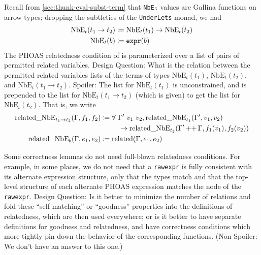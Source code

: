 Recall from \autoref{sec:thunk-eval-subst-term} that \texttt{NbEₜ} values are Gallina functions on arrow types; dropping the subtleties of the \texttt{UnderLets} monad, we had
\begin{align*}
  \text{NbE}_t(t_1 \to t_2) & \coloneqq \text{NbE}_t(t_1) \to \text{NbE}_t(t_2) \\
  \text{NbE}_t(b) & \coloneqq \texttt{expr}(b)
\end{align*}
The PHOAS relatedness condition of  is parameterized over a list of pairs of permitted related variables.
Design Question: What is the relation between the permitted related variables lists of the terms of types $\text{NbE}_t(t_1)$, $\text{NbE}_t(t_2)$, and $\text{NbE}_t(t_1 \to t_2)$.
Spoiler: The list for $\text{NbE}_t(t_1)$ is unconstrained, and is prepended to the list for $\text{NbE}_t(t_1 \to t_2)$ (which is given) to get the list for $\text{NbE}_t(t_2)$.
That is, we write
\begin{align*}
  \text{related\_NbE}_{t_1 \to t_2}(\Gamma, f_1, f_2) & \defeq \forall\ \Gamma'\ v_1\ v_2, \text{related\_NbE}_{t_1}(\Gamma', v_1, v_2) \\
  & \phantom{\defeq\forall~~}\to \text{related\_NbE}_{t_2}(\Gamma' \mathop{++} \Gamma, f_1(v_1), f_2(v_2)) \\
  \text{related\_NbE}_b(\Gamma, e_1, e_2) & \defeq \text{related}(\Gamma, e_1, e_2)
\end{align*}

Some correctness lemmas do not need full-blown relatedness conditions.
For example, in some places, we do not need that a \texttt{rawexpr} is fully consistent with its alternate expression structure, only that the types match and that the top-level structure of each alternate PHOAS expression matches the node of the \texttt{rawexpr}.
Design Question: Is it better to minimize the number of relations and fold these ``self-matching'' or ``goodness'' properties into the definitions of relatedness, which are then used everywhere; or is it better to have separate definitions for goodness and relatedness, and have correctness conditions which more tightly pin down the behavior of the corresponding functions.
(Non-Spoiler: We don't have an answer to this one.)


